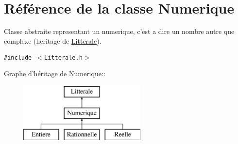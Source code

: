 \hypertarget{class_numerique}{
\section{Référence de la classe Numerique}
\label{class_numerique}
}
Classe abstraite representant un numerique, c'est a dire un nombre autre que complexe (heritage de \hyperlink{class_litterale}{Litterale}).  


{\tt \#include $<$Litterale.h$>$}

Graphe d'héritage de Numerique::\begin{figure}[H]
\begin{center}
\leavevmode
\includegraphics[height=3cm]{class_numerique}
\end{center}
\end{figure}
